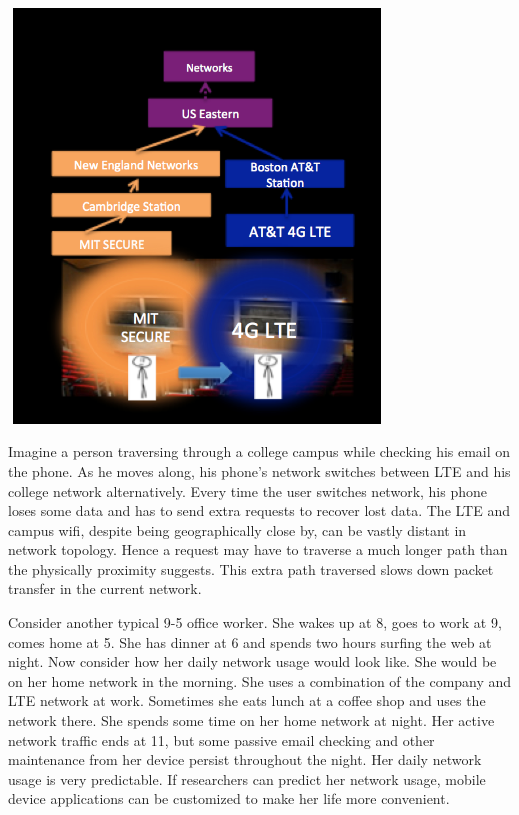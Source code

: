 \documentclass[]{article}
\newenvironment{Figure}
  {\par\medskip\noindent\minipage{\linewidth}}
  {\endminipage\par\medskip}
\begin{document}
\begin{Figure}
 \centering
 \includegraphics[height = 11cm, width =10cm]{topneqphys.png}
\end{Figure}

Imagine a person traversing through a college campus while checking his email on the phone. As he moves along, his phone's network switches between LTE and his college network alternatively. Every time the user switches network, his phone loses some data and has to send extra requests to recover lost data. The LTE and campus wifi, despite being geographically close by, can be vastly distant in network topology. Hence a request may have to traverse a much longer path than the physically proximity suggests. This extra path traversed slows down packet transfer in the current network. 

Consider another typical 9-5 office worker. She wakes up at 8, goes to work at 9, comes home at 5. She has dinner at 6 and spends two hours surfing the web at night. Now consider how her daily network usage would look like. She would be on her home network in the morning. She uses a combination of the company and LTE network at work. Sometimes she eats lunch at a coffee shop and uses the network there. She spends some time on her home network at night. Her active network traffic ends at 11, but some passive email checking and other maintenance from her device persist throughout the night. Her daily network usage is very predictable. If researchers can predict her network usage, mobile device applications can be customized to make her life more convenient. 
\end{document}
